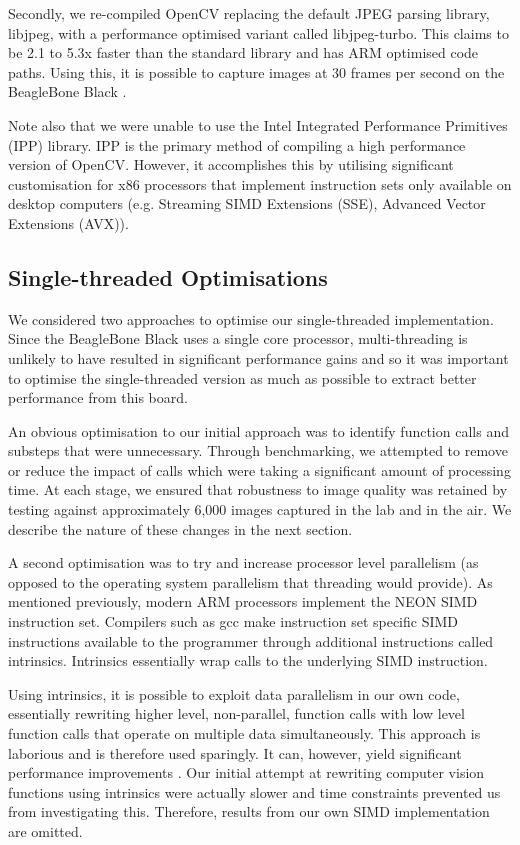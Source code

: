 \documentclass{acm_proc_article-sp}
\begin{document}
Secondly, we re-compiled OpenCV replacing the default JPEG parsing library, libjpeg, with a performance optimised variant called libjpeg-turbo. This claims to be 2.1 to 5.3x faster than the standard library \cite{libjpeg-turbo} and has ARM optimised code paths. Using this, it is possible to capture images at 30 frames per second on the BeagleBone Black \cite{bbb-30fps}.

Note also that we were unable to use the Intel Integrated Performance Primitives (IPP) library. IPP is the primary method of compiling a high performance version of OpenCV. However, it accomplishes this by utilising significant customisation for x86 processors that implement instruction sets only available on desktop computers (e.g. Streaming SIMD Extensions (SSE), Advanced Vector Extensions (AVX)). 

\subsection{Single-threaded Optimisations}
We considered two approaches to optimise our single-threaded implementation. Since the BeagleBone Black uses a single core processor, multi-threading is unlikely to have resulted in significant performance gains and so it was important to optimise the single-threaded version as much as possible to extract better performance from this board. 

An obvious optimisation to our initial approach was to identify function calls and substeps that were unnecessary. Through benchmarking, we attempted to remove or reduce the impact of calls which were taking a significant amount of processing time. At each stage, we ensured that robustness to image quality was retained by testing against approximately 6,000 images captured in the lab and in the air. We describe the nature of these changes in the next section.

A second optimisation was to try and increase processor level parallelism (as opposed to the operating system parallelism that threading would provide). As mentioned previously, modern ARM processors implement the NEON SIMD instruction set. Compilers such as gcc make instruction set specific SIMD instructions available to the programmer through additional instructions called intrinsics. Intrinsics essentially wrap calls to the underlying SIMD instruction.

Using intrinsics, it is possible to exploit data parallelism in our own code, essentially rewriting higher level, non-parallel, function calls with low level function calls that operate on multiple data simultaneously. This approach is laborious and is therefore used sparingly. It can, however, yield significant performance improvements \cite{mitra2013use}. Our initial attempt at rewriting computer vision functions using intrinsics were actually slower and time constraints prevented us from investigating this. Therefore, results from our own SIMD implementation are omitted.
\end{document}

